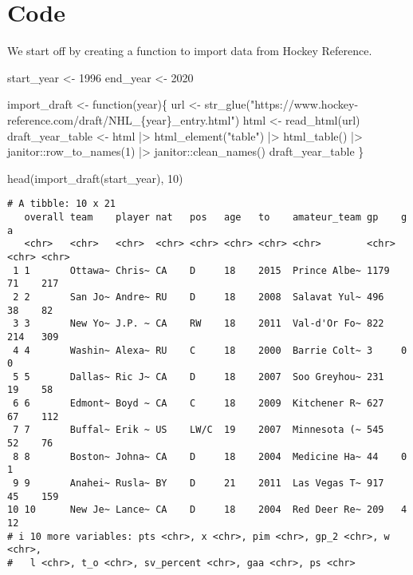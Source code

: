 \documentclass[
  letterpaper,
  DIV=11,
  numbers=noendperiod]{scrreprt}
\newenvironment{Shaded}{\begin{snugshade}}{\end{snugshade}}
\newcommand{\ControlFlowTok}[1]{\textcolor[rgb]{0.00,0.23,0.31}{#1}}
\newcommand{\DecValTok}[1]{\textcolor[rgb]{0.68,0.00,0.00}{#1}}
\newcommand{\FunctionTok}[1]{\textcolor[rgb]{0.28,0.35,0.67}{#1}}
\newcommand{\NormalTok}[1]{\textcolor[rgb]{0.00,0.23,0.31}{#1}}
\newcommand{\OtherTok}[1]{\textcolor[rgb]{0.00,0.23,0.31}{#1}}
\newcommand{\SpecialCharTok}[1]{\textcolor[rgb]{0.37,0.37,0.37}{#1}}
\newcommand{\StringTok}[1]{\textcolor[rgb]{0.13,0.47,0.30}{#1}}
\begin{document}

\chapter{Code}\label{code}

We start off by creating a function to import data from Hockey
Reference.

\begin{Shaded}
\begin{Highlighting}[]
\NormalTok{start\_year }\OtherTok{\textless{}{-}} \DecValTok{1996}
\NormalTok{end\_year }\OtherTok{\textless{}{-}} \DecValTok{2020}

\NormalTok{import\_draft }\OtherTok{\textless{}{-}} \ControlFlowTok{function}\NormalTok{(year)\{}
\NormalTok{  url }\OtherTok{\textless{}{-}} \FunctionTok{str\_glue}\NormalTok{(}\StringTok{"https://www.hockey{-}reference.com/draft/NHL\_\{year\}\_entry.html"}\NormalTok{)}
\NormalTok{  html }\OtherTok{\textless{}{-}} \FunctionTok{read\_html}\NormalTok{(url)}
\NormalTok{  draft\_year\_table }\OtherTok{\textless{}{-}}\NormalTok{ html }\SpecialCharTok{|\textgreater{}} 
    \FunctionTok{html\_element}\NormalTok{(}\StringTok{"table"}\NormalTok{) }\SpecialCharTok{|\textgreater{}} 
    \FunctionTok{html\_table}\NormalTok{() }\SpecialCharTok{|\textgreater{}} 
\NormalTok{    janitor}\SpecialCharTok{::}\FunctionTok{row\_to\_names}\NormalTok{(}\DecValTok{1}\NormalTok{) }\SpecialCharTok{|\textgreater{}} 
\NormalTok{    janitor}\SpecialCharTok{::}\FunctionTok{clean\_names}\NormalTok{()}
\NormalTok{  draft\_year\_table}
\NormalTok{\}}

\FunctionTok{head}\NormalTok{(}\FunctionTok{import\_draft}\NormalTok{(start\_year), }\DecValTok{10}\NormalTok{)}
\end{Highlighting}
\end{Shaded}

\begin{verbatim}
# A tibble: 10 x 21
   overall team    player nat   pos   age   to    amateur_team gp    g     a    
   <chr>   <chr>   <chr>  <chr> <chr> <chr> <chr> <chr>        <chr> <chr> <chr>
 1 1       Ottawa~ Chris~ CA    D     18    2015  Prince Albe~ 1179  71    217  
 2 2       San Jo~ Andre~ RU    D     18    2008  Salavat Yul~ 496   38    82   
 3 3       New Yo~ J.P. ~ CA    RW    18    2011  Val-d'Or Fo~ 822   214   309  
 4 4       Washin~ Alexa~ RU    C     18    2000  Barrie Colt~ 3     0     0    
 5 5       Dallas~ Ric J~ CA    D     18    2007  Soo Greyhou~ 231   19    58   
 6 6       Edmont~ Boyd ~ CA    C     18    2009  Kitchener R~ 627   67    112  
 7 7       Buffal~ Erik ~ US    LW/C  19    2007  Minnesota (~ 545   52    76   
 8 8       Boston~ Johna~ CA    D     18    2004  Medicine Ha~ 44    0     1    
 9 9       Anahei~ Rusla~ BY    D     21    2011  Las Vegas T~ 917   45    159  
10 10      New Je~ Lance~ CA    D     18    2004  Red Deer Re~ 209   4     12   
# i 10 more variables: pts <chr>, x <chr>, pim <chr>, gp_2 <chr>, w <chr>,
#   l <chr>, t_o <chr>, sv_percent <chr>, gaa <chr>, ps <chr>
\end{verbatim}
\end{document}
